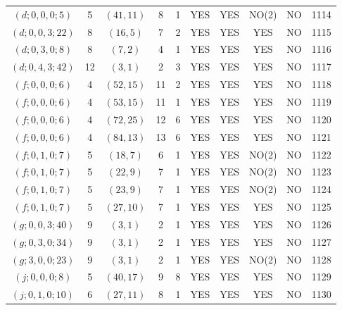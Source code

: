 \begin{longtable}{|c|c|c|c|c|c|c|c|c|c|}
$(d; 0, 0, 0; 5)$ & 5 & $(41, 11)$ & 8 & 1 & YES & YES & NO(2) & NO & 1114\\
$(d; 0, 0, 3; 22)$ & 8 & $(16, 5)$ & 7 & 2 & YES & YES & YES & NO & 1115\\
$(d; 0, 3, 0; 8)$ & 8 & $(7, 2)$ & 4 & 1 & YES & YES & YES & NO & 1116\\
$(d; 0, 4, 3; 42)$ & 12 & $(3, 1)$ & 2 & 3 & YES & YES & YES & NO & 1117\\
$(f; 0, 0, 0; 6)$ & 4 & $(52, 15)$ & 11 & 2 & YES & YES & YES & NO & 1118\\
$(f; 0, 0, 0; 6)$ & 4 & $(53, 15)$ & 11 & 1 & YES & YES & YES & NO & 1119\\
$(f; 0, 0, 0; 6)$ & 4 & $(72, 25)$ & 12 & 6 & YES & YES & YES & NO & 1120\\
$(f; 0, 0, 0; 6)$ & 4 & $(84, 13)$ & 13 & 6 & YES & YES & YES & NO & 1121\\
$(f; 0, 1, 0; 7)$ & 5 & $(18, 7)$ & 6 & 1 & YES & YES & NO(2) & NO & 1122\\
$(f; 0, 1, 0; 7)$ & 5 & $(22, 9)$ & 7 & 1 & YES & YES & NO(2) & NO & 1123\\
$(f; 0, 1, 0; 7)$ & 5 & $(23, 9)$ & 7 & 1 & YES & YES & NO(2) & NO & 1124\\
$(f; 0, 1, 0; 7)$ & 5 & $(27, 10)$ & 7 & 1 & YES & YES & YES & NO & 1125\\
$(g; 0, 0, 3; 40)$ & 9 & $(3, 1)$ & 2 & 1 & YES & YES & YES & NO & 1126\\
$(g; 0, 3, 0; 34)$ & 9 & $(3, 1)$ & 2 & 1 & YES & YES & YES & NO & 1127\\
$(g; 3, 0, 0; 23)$ & 9 & $(3, 1)$ & 2 & 1 & YES & YES & NO(2) & NO & 1128\\
$(j; 0, 0, 0; 8)$ & 5 & $(40, 17)$ & 9 & 8 & YES & YES & YES & NO & 1129\\
$(j; 0, 1, 0; 10)$ & 6 & $(27, 11)$ & 8 & 1 & YES & YES & YES & NO & 1130
\end{longtable}
